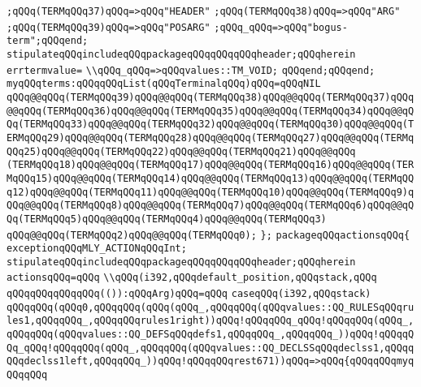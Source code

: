 \verb|;qQQq(TERMqQQq37)qQQq=>qQQq"HEADER"|\newline
\verb|;qQQq(TERMqQQq38)qQQq=>qQQq"ARG"|\newline
\verb|;qQQq(TERMqQQq39)qQQq=>qQQq"POSARG"|\newline
\verb|;qQQq_qQQq=>qQQq"bogus-term";qQQqend;|\newline
\verb|stipulateqQQqincludeqQQqpackageqQQqqQQqqQQqheader;qQQqherein|\newline
\verb|errtermvalue=|\newline
\verb|\\qQQq_qQQq=>qQQqvalues::TM_VOID;|\newline
\verb|qQQqend;qQQqend;|\newline
\verb|myqQQqterms:qQQqqQQqList(qQQqTerminalqQQq)qQQq=qQQqNIL|\newline
\verb|qQQq@@qQQq(TERMqQQq39)qQQq@@qQQq(TERMqQQq38)qQQq@@qQQq(TERMqQQq37)qQQq@@qQQq(TERMqQQq36)qQQq@@qQQq(TERMqQQq35)qQQq@@qQQq(TERMqQQq34)qQQq@@qQQq(TERMqQQq33)qQQq@@qQQq(TERMqQQq32)qQQq@@qQQq(TERMqQQq30)qQQq@@qQQq(TERMqQQq29)qQQq@@qQQq(TERMqQQq28)qQQq@@qQQq(TERMqQQq27)qQQq@@qQQq(TERMqQQq25)qQQq@@qQQq(TERMqQQq22)qQQq@@qQQq(TERMqQQq21)qQQq@@qQQq|\newline
\verb|(TERMqQQq18)qQQq@@qQQq(TERMqQQq17)qQQq@@qQQq(TERMqQQq16)qQQq@@qQQq(TERMqQQq15)qQQq@@qQQq(TERMqQQq14)qQQq@@qQQq(TERMqQQq13)qQQq@@qQQq(TERMqQQq12)qQQq@@qQQq(TERMqQQq11)qQQq@@qQQq(TERMqQQq10)qQQq@@qQQq(TERMqQQq9)qQQq@@qQQq(TERMqQQq8)qQQq@@qQQq(TERMqQQq7)qQQq@@qQQq(TERMqQQq6)qQQq@@qQQq(TERMqQQq5)qQQq@@qQQq(TERMqQQq4)qQQq@@qQQq(TERMqQQq3)|\newline
\verb|qQQq@@qQQq(TERMqQQq2)qQQq@@qQQq(TERMqQQq0);|\newline
\verb|};|\newline
\verb|packageqQQqactionsqQQq{|\newline
\verb|exceptionqQQqMLY_ACTIONqQQqInt;|\newline
\verb|stipulateqQQqincludeqQQqpackageqQQqqQQqqQQqheader;qQQqherein|\newline
\verb|actionsqQQq=qQQq|\newline
\verb|\\qQQq(i392,qQQqdefault_position,qQQqstack,qQQq|\newline
\verb|qQQqqQQqqQQqqQQq(()):qQQqArg)qQQq=qQQq|\newline
\verb|caseqQQq(i392,qQQqstack)|\newline
\verb|qQQqqQQq(qQQq0,qQQqqQQq(qQQq(qQQq_,qQQqqQQq(qQQqvalues::QQ_RULESqQQqrules1,qQQqqQQq_,qQQqqQQqrules1right))qQQq!qQQqqQQq_qQQq!qQQqqQQq(qQQq_,qQQqqQQq(qQQqvalues::QQ_DEFSqQQqdefs1,qQQqqQQq_,qQQqqQQq_))qQQq!qQQqqQQq_qQQq!qQQqqQQq(qQQq_,qQQqqQQq(qQQqvalues::QQ_DECLSSqQQqdeclss1,qQQqqQQqdeclss1left,qQQqqQQq_))qQQq!qQQqqQQqrest671))qQQq=>qQQq{qQQqqQQqmyqQQqqQQq|\newline
